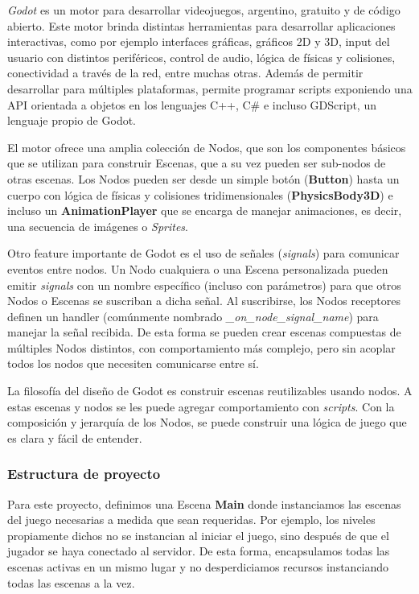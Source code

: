 \noindent \textit{Godot} es un motor para desarrollar videojuegos, argentino, gratuito y de código abierto. 
Este motor brinda distintas herramientas para desarrollar aplicaciones interactivas, como por ejemplo 
interfaces gráficas, gráficos 2D y 3D, input del usuario con distintos periféricos, control de audio, 
lógica de físicas y colisiones, conectividad a través de la red, entre muchas otras.
Además de permitir desarrollar para múltiples plataformas, permite programar scripts exponiendo una 
API orientada a objetos en los lenguajes C++, C\# e incluso GDScript, un lenguaje propio de Godot.

El motor ofrece una amplia colección de Nodos, que son los componentes básicos que se utilizan para 
construir Escenas, que a su vez pueden ser sub-nodos de otras escenas. Los Nodos pueden ser desde un 
simple botón (\textbf{Button}) hasta un cuerpo con lógica de físicas y colisiones tridimensionales 
(\textbf{PhysicsBody3D}) e incluso un \textbf{AnimationPlayer} que se encarga de manejar animaciones, 
es decir, una secuencia de imágenes o \textit{Sprites}.

Otro feature importante de Godot es el uso de señales (\textit{signals}) para comunicar eventos entre nodos.
Un Nodo cualquiera o una Escena personalizada pueden emitir \textit{signals} con un nombre específico 
(incluso con parámetros) para que otros Nodos o Escenas se suscriban a dicha señal. Al suscribirse, los 
Nodos receptores definen un handler (comúnmente nombrado \textit{\_on\_node\_signal\_name}) para manejar 
la señal recibida. De esta forma se pueden crear escenas compuestas de múltiples Nodos distintos, con 
comportamiento más complejo, pero sin acoplar todos los nodos que necesiten comunicarse entre sí.

La filosofía del diseño de Godot es construir escenas reutilizables usando nodos. A estas escenas y 
nodos se les puede agregar comportamiento con \textit{scripts}. Con la composición y jerarquía de los Nodos, 
se puede construir una lógica de juego que es clara y fácil de entender.

\subsubsection{Estructura de proyecto}

\noindent Para este proyecto, definimos una Escena \textbf{Main} donde instanciamos las escenas del juego necesarias 
a medida que sean requeridas. Por ejemplo, los niveles propiamente dichos no se instancian al iniciar el 
juego, sino después de que el jugador se haya conectado al servidor. De esta forma, encapsulamos todas las 
escenas activas en un mismo lugar y no desperdiciamos recursos instanciando todas las escenas a la vez.

